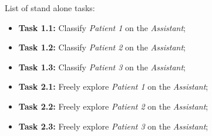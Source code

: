 \hfill


List of stand alone tasks:


\hfill

\begin{itemize}
\item[] \textbf{Task 1.1:} Classify \textit{Patient 1} on the \textit{Assistant};
\item[] \textbf{Task 1.2:} Classify \textit{Patient 2} on the \textit{Assistant};
\item[] \textbf{Task 1.3:} Classify \textit{Patient 3} on the \textit{Assistant};
\end{itemize}

\hfill

\begin{itemize}
\item[] \textbf{Task 2.1:} Freely explore \textit{Patient 1} on the \textit{Assistant};
\item[] \textbf{Task 2.2:} Freely explore \textit{Patient 2} on the \textit{Assistant};
\item[] \textbf{Task 2.3:} Freely explore \textit{Patient 3} on the \textit{Assistant};
\end{itemize}

\hfill

